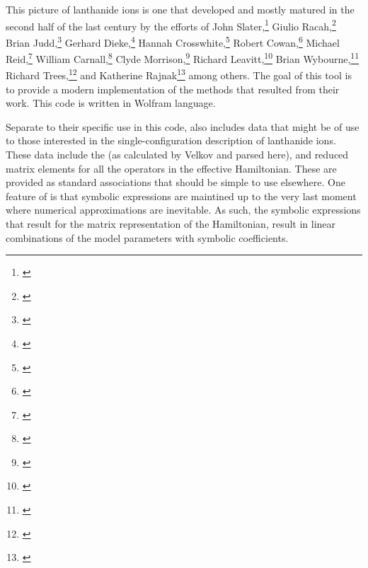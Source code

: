 \documentclass[11pt, twoside,openright]{article}
\begin{document}
This picture of lanthanide ions is one that developed and mostly matured in the second half of the last century by the efforts of 
John Slater,\footnote{\cite{slater_theory_1929}}
Giulio Racah,\footnote{\cite{racah_theory_1942-1,racah_theory_1942,racah_theory_1943,racah_theory_1949}}
Brian Judd,\footnote{\cite{judd_optical_1962,judd_operator_1963,judd_configuration_1963,judd_three-particle_1966,judd_second_1967,judd_intra-atomic_1968,crosswhite_magnetic_1968,judd_parametric_1982,judd_operator_1983,judd_complete_1984,judd_orthogonalized_1984,judd_complex_1985,judd_classification_1986,judd_atomic_1988,judd_developments_1989,judd_symmetries_1993,judd_group_1996,judd_interaction_2005}}
Gerhard Dieke,\footnote{\cite{dieke_spectra_1963,piksis_energy_1967,dieke_spectra_1968}}
Hannah Crosswhite,\footnote{\cite{crosswhite_magnetic_1968,crosswhite_effective_1971,crosswhite_spectrum_1976,crosswhite_parametric_1977,dieke_spectra_1963,judd_intra-atomic_1968,judd_orthogonalized_1984}}
Robert Cowan,\footnote{\cite{cowan_theory_1981}}
Michael Reid,\footnote{\cite{reid_applications_1981}}
William Carnall,\footnote{\cite{carnall_spectral_1965,carnall_systematic_1989,carnall_systematic_1992,carnall_electronic_1968-1,carnall_spectral_1968,carnall_electronic_1968-2,carnall_electronic_1968-3,carnall_electronic_1968,carnall_absorption_1970,carnall_energy_1976,gorller-walrand_magnetic_1991}}
Clyde Morrison,\footnote{\cite{morrison_crystal-field_1976,morrison_crystal-field_1979,morrison_energy_1994,morrison_host_1980,morrison_analysis_1987,morrison_theoretical_1977,morrison_rare-earth_1977,morrison_spectroscopic_1982,morrison_optical_1983}}
Richard Leavitt,\footnote{\cite{leavitt_complete_1987,leavitt_role_1982,leavitt_crystal-field_1980,morrison_crystal-field_1979,morrison_spectroscopic_1982}}
Brian Wybourne,\footnote{\cite{carnall_spectral_1965,conway_low-lying_1963,rajnak_configuration_1963,rajnak_electrostatically_1964,rajnak_configuration_1964,wybourne_low-lying_1964,wybourne_orbitorbit_1964,wybourne_spectroscopic_1965,wybourne_symmetry_1970,wybourne_optical_2007}}
Richard Trees,\footnote{\cite{trees_l_1952,trees_spin-spin_1951,trees_comparison_1958}}
and Katherine Rajnak\footnote{\cite{rajnak_configuration_1963,rajnak_electrostatically_1964,rajnak_configuration_1964,rajnak_configuration_1965}} among others. The goal of this tool is to provide a modern implementation of the methods that resulted from their work. This code is written in Wolfram language.

Separate to their specific use in this code, \qlanth also includes data that might be of use to those interested in the single-configuration description of lanthanide ions. These data include the \cfps (as calculated by Velkov and parsed here), and reduced matrix elements for all the operators in the effective Hamiltonian. These are provided as standard \mathematica associations that should be simple to use elsewhere. One feature of \qlanth is that symbolic expressions are maintined up to the very last moment where numerical approximations are inevitable. As such, the symbolic expressions that result for the matrix representation of the Hamiltonian, result in linear combinations of the model parameters with symbolic coefficients.
\end{document}
